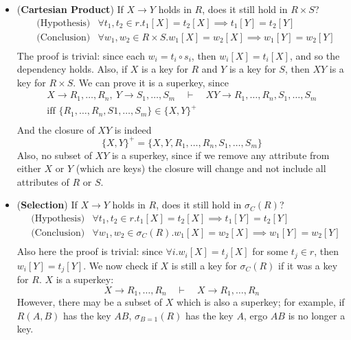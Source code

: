 \begin{itemize}
    \item (\textbf{Cartesian Product}) If $X \rightarrow Y$ holds in $R$, does it still hold in $R \times S$?
    \begin{align*}
        &\text{(Hypothesis)} &\forall t_1, t_2 \in r . t_1[X] = t_2[X] \implies t_1[Y] = t_2[Y] \\
        &\text{(Conclusion)} &\forall w_1, w_2 \in R \times S . w_1[X] = w_2[X] \implies w_1[Y] = w_2[Y] \\
    \end{align*}
    The proof is trivial: since each $w_i = t_i \circ s_i$, then $w_i[X] = t_i[X]$, and so the dependency holds. Also, if $X$ is a key for $R$ and $Y$ is a key for $S$, then $XY$ is a key for $R \times S$. We can prove it is a superkey, since
    \begin{gather*}
        X \rightarrow R_1, \ldots, R_n, \ Y \rightarrow S_1, \ldots, S_m  \quad \vdash \quad XY \rightarrow R_1, \ldots, R_n, S_1, \ldots, S_m\\
        \text{iff } \{R_1, \ldots, R_n, S1, \ldots, S_m\} \in \{X,Y\}^+ \\
    \end{gather*}
    And the closure of $XY$ is indeed
    \begin{equation*}
        \{X,Y\}^+ = \{X,Y, R_1, \ldots, R_n, S_1, \ldots, S_m\}
    \end{equation*}
    Also, no subset of $XY$ is a superkey, since if we remove any attribute from either $X$ or $Y$ (which are keys) the closure will change and not include all attributes of $R$ or $S$.
    \item (\textbf{Selection}) If $X \rightarrow Y$ holds in $R$, does it still hold in $\sigma_C(R)$?
    \begin{align*}
        &\text{(Hypothesis)} &\forall t_1, t_2 \in r . t_1[X] = t_2[X] \implies t_1[Y] = t_2[Y] \\
        &\text{(Conclusion)} &\forall w_1, w_2 \in \sigma_C(R) . w_1[X] = w_2[X] \implies w_1[Y] = w_2[Y] \\
    \end{align*}
    Also here the proof is trivial: since $\forall i. w_i[X] = t_j[X]$ for some $t_j \in r$, then $w_i[Y] = t_j[Y]$. We now check if $X$ is still a key for $\sigma_C(R)$ if it was a key for $R$. $X$ is a superkey:
    \begin{equation*}
        X \rightarrow R_1, \ldots, R_n \quad \vdash \quad X \rightarrow R_1, \ldots, R_n
    \end{equation*}
    However, there may be a subset of $X$ which is also a superkey; for example, if $R(A,B)$ has the key $AB$, $\sigma_{B=1}(R)$ has the key $A$, ergo $AB$ is no longer a key.
\end{itemize}

